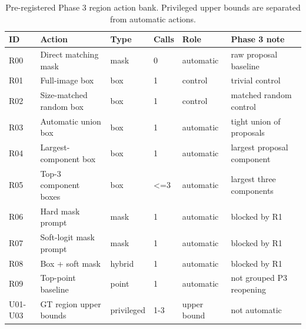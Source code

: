 \begin{table}[t]
\centering
\small
\caption{Pre-registered Phase 3 region action bank. Privileged upper bounds are separated from automatic actions.}
\label{tab:region_actions}
\begin{tabular}{llllll}
\hline
ID & Action & Type & Calls & Role & Phase 3 note \\
\hline
R00 & Direct matching mask & mask & 0 & automatic & raw proposal baseline \\
R01 & Full-image box & box & 1 & control & trivial control \\
R02 & Size-matched random box & box & 1 & control & matched random control \\
R03 & Automatic union box & box & 1 & automatic & tight union of proposals \\
R04 & Largest-component box & box & 1 & automatic & largest proposal component \\
R05 & Top-3 component boxes & box & <=3 & automatic & largest three components \\
R06 & Hard mask prompt & mask & 1 & automatic & blocked by R1 \\
R07 & Soft-logit mask prompt & mask & 1 & automatic & blocked by R1 \\
R08 & Box + soft mask & hybrid & 1 & automatic & blocked by R1 \\
R09 & Top-point baseline & point & 1 & automatic & not grouped P3 reopening \\
U01-U03 & GT region upper bounds & privileged & 1-3 & upper bound & not automatic \\
\hline
\end{tabular}
\end{table}
